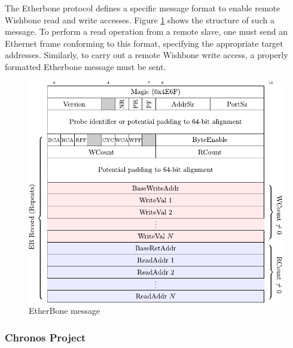 \noindent The Etherbone protocol defines a specific message format to enable remote Wishbone read and write accesses. Figure \ref{fig:EtherBone-msg} shows the structure of such a message. To perform a read operation from a remote slave, one must send an Ethernet frame conforming to this format, specifying the appropriate target addresses. Similarly, to carry out a remote Wishbone write access, a properly formatted Etherbone message must be sent.

\vspace{5 mm}


\begin{figure}[H]
    \centering
    \includegraphics[width=15cm]{figures/EtherBone_msg.pdf}
    \caption{EtherBone message}
    \label{fig:EtherBone-msg}
\end{figure}

\subsubsection{Chronos Project}

